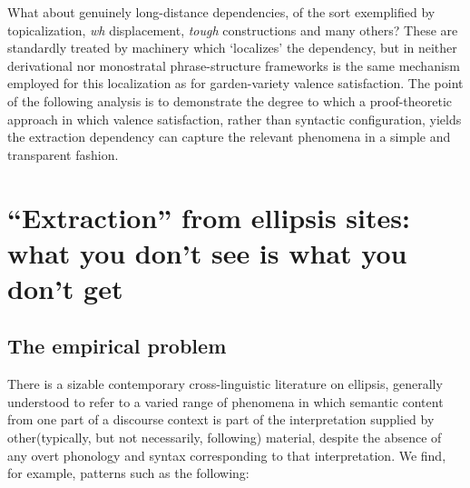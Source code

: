 \documentclass[output=paper,colorlinks,citecolor=brown]{langscibook}
\begin{document}
What about genuinely long-distance dependencies, of the sort
exemplified by topicalization, \textit{wh} displacement, \textit{tough}
constructions and many others? These are standardly treated by
machinery which `localizes' the dependency, but in neither
derivational nor monostratal phrase-structure frameworks is the same
mechanism employed for this localization as for garden-variety valence
satisfaction. The point of the following analysis is to demonstrate
the degree to which a proof-theoretic approach in which valence satisfaction,
rather than syntactic configuration, yields the extraction dependency
can capture the relevant phenomena in a simple and transparent fashion.

\section{``Extraction'' from ellipsis sites: what you don't see is what you don't get}
\label{sec-extraction}

\subsection{The empirical problem}

There is a sizable contemporary cross-linguistic literature on
ellipsis, generally understood to refer to a varied range of phenomena
in which semantic content from one part of a discourse context is
part of the interpretation supplied by other(typically, but
not necessarily, following)  material, despite the absence of any
overt phonology and syntax corresponding to that interpretation. We
find, for example, patterns such as the following:
\end{document}
